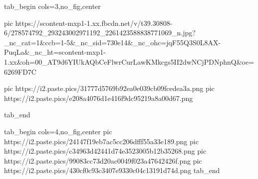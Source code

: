  
 
 
 
 


\ifcmt
  tab_begin cols=3,no_fig,center

     pic https://scontent-mxp1-1.xx.fbcdn.net/v/t39.30808-6/278574792_293243002971192_2261423588838771069_n.jpg?_nc_cat=1&ccb=1-5&_nc_sid=730e14&_nc_ohc=jqF55Q3S0L8AX-PuqLa&_nc_ht=scontent-mxp1-1.xx&oh=00_AT9d6YIUkAQbCeFlwrCurLawKMkcgs5II2dwNCjPDNphnQ&oe=6269FD7C

		 pic https://i2.paste.pics/31777d5769b92ea0e039cb09fcedea3a.png
		 pic https://i2.paste.pics/e208a4076d1e416f9dc95219a8a00d67.png

  tab_end
\fi

\ifcmt
  tab_begin cols=4,no_fig,center
     pic https://i2.paste.pics/24147f19eb7ac5cc206dfff55a33e189.png
		 pic https://i2.paste.pics/c34963d42441d74e3523005b12b35268.png
     pic https://i2.paste.pics/99083cc73d20ac0049f023a47642426f.png
		 pic https://i2.paste.pics/430cf0c93c3407e9330c04c13191d74d.png
  tab_end
\fi
